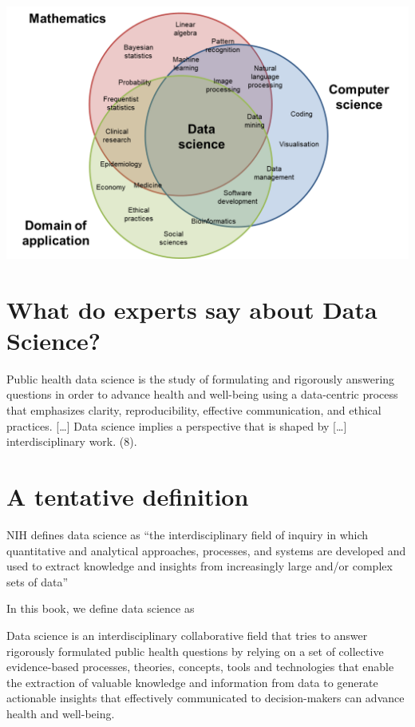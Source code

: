 \documentclass[
  letterpaper,
  DIV=11,
  numbers=noendperiod,
  oneside]{scrreprt}
\begin{document}
\includegraphics{./images/paste-494B1CA8.png}

\hypertarget{what-do-experts-say-about-data-science}{%
\section{What do experts say about Data
Science?}\label{what-do-experts-say-about-data-science}}

Public health data science is the study of formulating and rigorously
answering questions in order to advance health and well-being using a
data-centric process that emphasizes clarity, reproducibility, effective
communication, and ethical practices. {[}\ldots{]} Data science implies
a perspective that is shaped by {[}\ldots{]} interdisciplinary work.
(8).

\hypertarget{a-tentative-definition}{%
\section{A tentative definition}\label{a-tentative-definition}}

NIH defines data science as ``the interdisciplinary field of inquiry in
which quantitative and analytical approaches, processes, and systems are
developed and used to extract knowledge and insights from increasingly
large and/or complex sets of data''

In this book, we define data science as

Data science is an interdisciplinary collaborative field that tries to
answer rigorously formulated public health questions by relying on a set
of collective evidence-based processes, theories, concepts, tools and
technologies that enable the extraction of valuable knowledge and
information from data to generate actionable insights that effectively
communicated to decision-makers can advance health and well-being.
\end{document}
